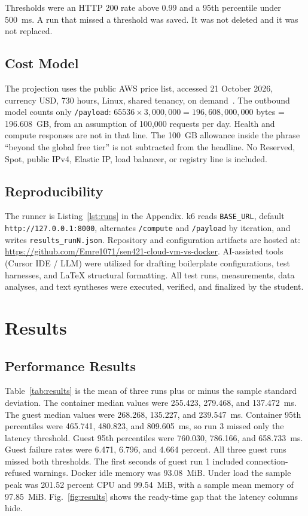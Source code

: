 \documentclass[conference,a4paper]{IEEEtran}
\begin{document}
Thresholds were an HTTP 200 rate above 0.99 and a 95th percentile under 500~ms. A run that missed a threshold was saved. It was not deleted and it was not replaced.

\subsection{Cost Model}

The projection uses the public AWS price list, accessed 21 October 2026, currency USD, 730 hours, Linux, shared tenancy, on demand~\cite{b6}. The outbound model counts only \texttt{/payload}: \(65536 \times 3{,}000{,}000 = 196{,}608{,}000{,}000\) bytes = 196.608~GB, from an assumption of 100{,}000 requests per day. Health and compute responses are not in that line. The 100~GB allowance inside the phrase ``beyond the global free tier'' is not subtracted from the headline. No Reserved, Spot, public IPv4, Elastic IP, load balancer, or registry line is included.

\subsection{Reproducibility}

The runner is Listing~\ref{lst:runs} in the Appendix. k6 reads \texttt{BASE\_URL}, default \texttt{http://127.0.0.1:8000}, alternates \texttt{/compute} and \texttt{/payload} by iteration, and writes \texttt{results\_runN.json}. Repository and configuration artifacts are hosted at: \url{https://github.com/Emre1071/sen421-cloud-vm-vs-docker}. AI-assisted tools (Cursor IDE / LLM) were utilized for drafting boilerplate configurations, test harnesses, and LaTeX structural formatting. All test runs, measurements, data analyses, and text syntheses were executed, verified, and finalized by the student.

\section{Results}
\label{sec:results}

\subsection{Performance Results}

Table~\ref{tab:results} is the mean of three runs plus or minus the sample standard deviation. The container median values were 255.423, 279.468, and 137.472~ms. The guest median values were 268.268, 135.227, and 239.547~ms. Container 95th percentiles were 465.741, 480.823, and 809.605~ms, so run 3 missed only the latency threshold. Guest 95th percentiles were 760.030, 786.166, and 658.733~ms. Guest failure rates were 6.471, 6.796, and 4.664 percent. All three guest runs missed both thresholds. The first seconds of guest run 1 included connection-refused warnings. Docker idle memory was 93.08~MiB. Under load the sample peak was 201.52 percent CPU and 99.54~MiB, with a sample mean memory of 97.85~MiB. Fig.~\ref{fig:results} shows the ready-time gap that the latency columns hide.
\end{document}
